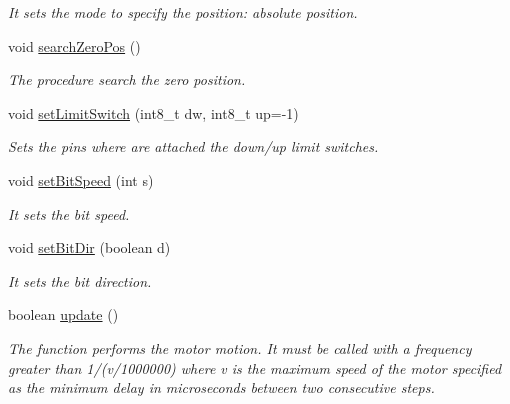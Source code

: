 \begin{DoxyCompactItemize}
\begin{DoxyCompactList}\small\item\em It sets the mode to specify the position\+: absolute position. \end{DoxyCompactList}\item 
void \hyperlink{class_milling_machine_a4c8204cae4818204035e210080a2705d}{search\+Zero\+Pos} ()
\begin{DoxyCompactList}\small\item\em The procedure search the zero position. \end{DoxyCompactList}\item 
void \hyperlink{class_milling_machine_abea98221e7a7fe1a9366e5f8d200f268}{set\+Limit\+Switch} (int8\+\_\+t dw, int8\+\_\+t up=-\/1)
\begin{DoxyCompactList}\small\item\em Sets the pins where are attached the down/up limit switches. \end{DoxyCompactList}\item 
void \hyperlink{class_milling_machine_a9d059e6adb7edd4ee42a0d6fce0338c3}{set\+Bit\+Speed} (int s)
\begin{DoxyCompactList}\small\item\em It sets the bit speed. \end{DoxyCompactList}\item 
void \hyperlink{class_milling_machine_aa9e80231444db8c4bfaef2829a12230f}{set\+Bit\+Dir} (boolean d)
\begin{DoxyCompactList}\small\item\em It sets the bit direction. \end{DoxyCompactList}\item 
boolean \hyperlink{class_milling_machine_ac74c527eb504eb6f13d80fb64487c874}{update} ()
\begin{DoxyCompactList}\small\item\em The function performs the motor motion. It must be called with a frequency greater than 1/(v/1000000) where v is the maximum speed of the motor specified as the minimum delay in microseconds between two consecutive steps. \end{DoxyCompactList}\end{DoxyCompactItemize}
